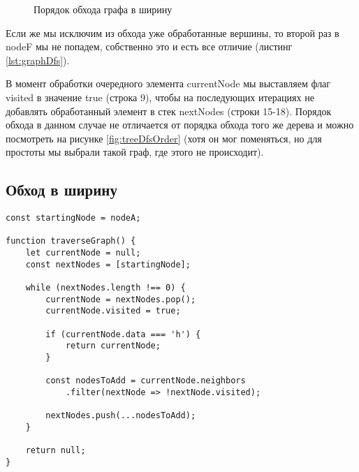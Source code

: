 \documentclass[../article.tex]{subfiles}
\begin{document}
\begin{figure}
    \caption{Порядок обхода графа в ширину}
    \label{fig:graphBfsOrder}
\end{figure}

Если же мы исключим из обхода уже обработанные вершины, то второй раз в {\firacodebold nodeF} мы не попадем, собственно это и есть все отличие (листинг \ref{lst:graphDfs}).

В момент обработки очередного элемента {\firacodebold currentNode} мы выставляем флаг {\firacodebold visited} в значение {\firacodebold true} (строка 9), чтобы на последующих итерациях не добавлять обработанный элемент в стек {\firacodebold nextNodes} (строки 15-18). Порядок обхода в данном случае не отличается от порядка обхода того же дерева и можно посмотреть на рисунке \ref{fig:treeDfsOrder} (хотя он мог поменяться, но для простоты мы выбрали такой граф, где этого не происходит).

\subsection{Обход в ширину}

\begin{figure*}[h]
    \begin{ruledelement}
        \begin{lstlisting}[caption={Обход графа в глубину}, label={lst:graphDfs}]
const startingNode = nodeA;

function traverseGraph() {
    let currentNode = null;
    const nextNodes = [startingNode];

    while (nextNodes.length !== 0) {
        currentNode = nextNodes.pop();
        currentNode.visited = true;

        if (currentNode.data === 'h') {
            return currentNode;
        }

        const nodesToAdd = currentNode.neighbors
            .filter(nextNode => !nextNode.visited);

        nextNodes.push(...nodesToAdd);
    }

    return null;
}
        \end{lstlisting}
    \end{ruledelement}

\end{figure*}
\end{document}
